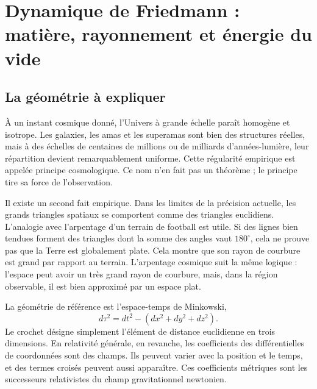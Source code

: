 \chapter{Dynamique de Friedmann : matière, rayonnement et énergie du vide}


\section{La géométrie à expliquer}

À un instant cosmique donné, l’Univers à grande échelle paraît homogène et isotrope. Les galaxies, les amas et les superamas sont bien des structures réelles, mais à des échelles de centaines de millions ou de milliards d’années-lumière, leur répartition devient remarquablement uniforme. Cette régularité empirique est appelée principe cosmologique. Ce nom n’en fait pas un théorème ; le principe tire sa force de l’observation.

Il existe un second fait empirique. Dans les limites de la précision actuelle, les grands triangles spatiaux se comportent comme des triangles euclidiens. L’analogie avec l’arpentage d’un terrain de football est utile. Si des lignes bien tendues forment des triangles dont la somme des angles vaut \(180^\circ\), cela ne prouve pas que la Terre est globalement plate. Cela montre que son rayon de courbure est grand par rapport au terrain. L’arpentage cosmique suit la même logique : l’espace peut avoir un très grand rayon de courbure, mais, dans la région observable, il est bien approximé par un espace plat.

La géométrie de référence est l’espace-temps de Minkowski,
\begin{equation}
  d\tau^2=dt^2-\left(dx^2+dy^2+dz^2\right).
  \label{eq:l09-minkowski}
\end{equation}
Le crochet désigne simplement l’élément de distance euclidienne en trois dimensions. En relativité générale, en revanche, les coefficients des différentielles de coordonnées sont des champs. Ils peuvent varier avec la position et le temps, et des termes croisés peuvent aussi apparaître. Ces coefficients métriques sont les successeurs relativistes du champ gravitationnel newtonien.

